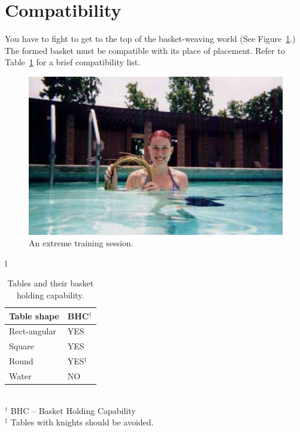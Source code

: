 \documentclass{outhesis}
\begin{document}
\section{Compatibility}

You have to fight to get to the top of the basket-weaving world (See Figure~\ref{fig:training}.)
The formed basket must be compatible with its place of placement.
Refer to Table~\ref{tab:baskets} for a brief compatibility list.

\begin{figure}
  \centering
  \includegraphics[scale=0.5]{figures/ubw}
  \caption{An extreme training session.}
  \label{fig:training}
\end{figure}


\begin{table}
  \caption{Tables and their basket holding capability.}
  \label{tab:baskets}
  \centering
  \begin{tabular}{l}
    \begin{tabular*}{0.6\textwidth}{l @{\extracolsep{\fill}} l} \hline \hline
      Table shape   & BHC$^{\dagger}$ \\ \hline
      Rect-angular  & YES \\
      Square        & YES \\
      Round         & YES$^{\ddagger}$ \\
      Water         & NO \\ \hline
    \end{tabular*} \\
    $^{\dagger}$ BHC -- Basket Holding Capability \\
    $^{\ddagger}$ Tables with knights should be avoided. \\
  \end{tabular}
\end{table}






% 
% 

\end{document}
